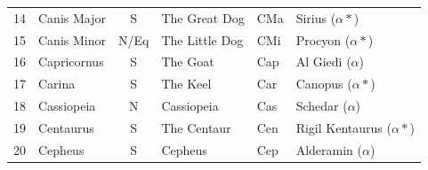 \documentclass[a4paper,12pt]{extarticle}
\begin{document}
\begin{table}[H]
\begin{tabular}{llclll}
14                                                                              & Canis Major                                   & S                                        & The Great Dog                                   & CMa                                                                              & Sirius  ($\alpha \ast$)                        \\
15                                                                              & Canis Minor                                   & N/Eq                                     & The Little Dog                                  & CMi                                                                              & Procyon ($\alpha \ast$)                        \\
16                                                                              & Capricornus                                   & S                                        & The Goat                                        & Cap                                                                              & Al Giedi ($\alpha$)                            \\
17                                                                              & Carina                                        & S                                        & The Keel                                        & Car                                                                              & Canopus ($\alpha\ast$)                         \\
18                                                                              & Cassiopeia                                    & N                                        & Cassiopeia                                      & Cas                                                                              & Schedar ($\alpha$)                              \\
19                                                                              & Centaurus                                     & S                                        & The Centaur                                     & Cen                                                                              & Rigil Kentaurus  ($\alpha \ast$)               \\
20                                                                              & Cepheus                                       & S                                        & Cepheus                                         & Cep                                                                              & Alderamin  ($\alpha$)                          \\

\end{tabular}
\end{table}
\end{document}

